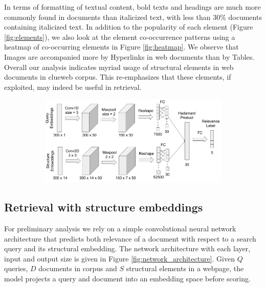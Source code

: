 \documentclass[runningheads,a4paper]{llncs}
\begin{document}
In terms of formatting of textual content, bold texts and headings 
are much more commonly found in documents than italicized text, with less than 
30\% documents containing italicized text. In addition to the popularity of each 
element (Figure \ref{fig:elements}), we also look at the element co-occurrence 
patterns using a heatmap of co-occurring elements in Figure 
\ref{fig:heatmap}. We observe that Images are accompanied more by Hyperlinks in 
web documents than by Tables. Overall our analysis indicates myriad usage of 
structural elements in web documents in clueweb corpus. This re-emphasizes that 
these elements, if exploited, may indeed be useful in retrieval.  
    \begin{figure}
    \centering
    \caption{Network architecture}
    \label{fig:network_architecture}
    \begin{subfigure}[b]{0.70\textwidth}
    \includegraphics[width=\textwidth]{diagrams.png}
    \end{subfigure}
    \end{figure}
\subsection{Retrieval with structure embeddings}
For preliminary analysis we rely on a simple convolutional neural 
network architecture that predicts both relevance of a document with 
respect to a search query and its structural embedding. 
The network architecture with each layer, input and output size 
is given in Figure \ref{fig:network_architecture}. 
Given $\mathit{Q}$ queries, $\mathit{D}$ documents in corpus and $\mathit{S}$ 
structural elements in a webpage, the model projects a query 
and document into an embedding space before scoring.
\end{document}
